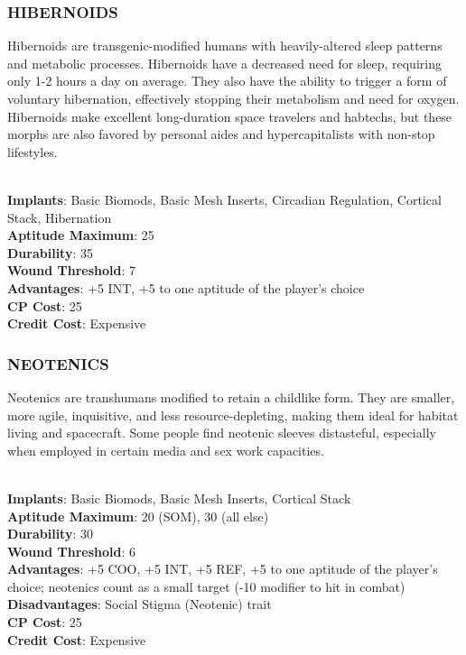 \subsubsection{HIBERNOIDS}
Hibernoids are transgenic-modified humans with heavily-altered sleep patterns
and metabolic processes.  Hibernoids have a decreased need for sleep, requiring
only 1-2 hours a day on average. They also have the ability to trigger a form
of voluntary hibernation, effectively stopping their metabolism and need for
oxygen. Hibernoids make excellent long-duration space travelers and habtechs,
but these morphs are also favored by personal aides and hypercapitalists with
non-stop lifestyles.

\\ \textbf{Implants}: Basic Biomods, Basic Mesh Inserts, Circadian Regulation, Cortical Stack, Hibernation
\\ \textbf{Aptitude Maximum}: 25
\\ \textbf{Durability}: 35
\\ \textbf{Wound Threshold}: 7
\\ \textbf{Advantages}: +5 INT, +5 to one aptitude of the player’s choice
\\ \textbf{CP Cost}: 25
\\ \textbf{Credit Cost}: Expensive

\subsubsection{NEOTENICS}
Neotenics are transhumans modified to retain a childlike form. They are
smaller, more agile, inquisitive, and less resource-depleting, making them
ideal for habitat living and spacecraft. Some people find neotenic sleeves
distasteful, especially when employed in certain media and sex work capacities.

\\ \textbf{Implants}: Basic Biomods, Basic Mesh Inserts, Cortical Stack
\\ \textbf{Aptitude Maximum}: 20 (SOM), 30 (all else)
\\ \textbf{Durability}: 30
\\ \textbf{Wound Threshold}: 6
\\ \textbf{Advantages}: +5 COO, +5 INT, +5 REF, +5 to one aptitude of the player’s choice; neotenics count as a small target (-10 modifier to hit in combat)
\\ \textbf{Disadvantages}: Social Stigma (Neotenic) trait
\\ \textbf{CP Cost}: 25
\\ \textbf{Credit Cost}: Expensive

